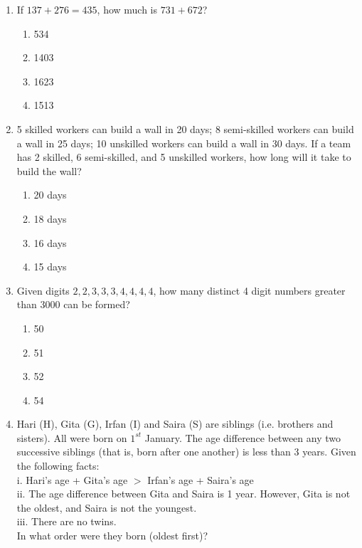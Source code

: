 \documentclass[journal]{IEEEtran}
\begin{document}
\begin{enumerate}
    \item If $137+276=435$, how much is $731+672$?

        \begin{multicols}{4}
            \begin{enumerate}
                \item 534
                \item 1403
                \item 1623
                \item 1513
            \end{enumerate}
        \end{multicols}
        
    \item 5 skilled workers can build a wall in 20 days; 8 semi-skilled workers can build a wall in 25 days; 10 unskilled workers can build a wall in 30 days. If a team has 2 skilled, 6 semi-skilled, and 5 unskilled workers, how long will it take to build the wall?

        \begin{multicols}{4}
            \begin{enumerate}
                \item 20 days
                \item 18 days
                \item 16 days
                \item 15 days
            \end{enumerate}
        \end{multicols}

    \item Given digits $2,2,3,3,3,4,4,4,4$, how many distinct 4 digit numbers greater than 3000 can be formed?

        \begin{multicols}{4}
            \begin{enumerate}
                \item 50
                \item 51
                \item 52
                \item 54
            \end{enumerate}
        \end{multicols}
        
    \item Hari (H), Gita (G), Irfan (I) and Saira (S) are siblings (i.e. brothers and sisters). All were born on $1^{st}$ January. The age difference between any two successive siblings (that is, born after one another) is less than 3 years. Given the following facts:\\
    i. Hari's age + Gita's age $>$ Irfan's age + Saira's age\\
    ii. The age difference between Gita and Saira is 1 year. However, Gita is not the oldest, and Saira is not the youngest.\\
    iii. There are no twins.\\
    In what order were they born (oldest first)? 


\end{enumerate}
\end{document}
